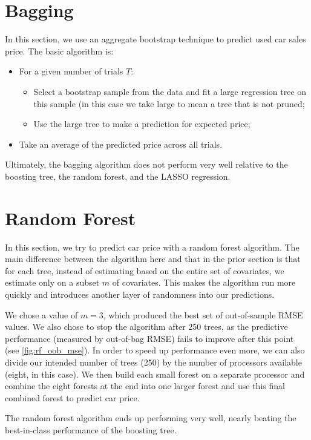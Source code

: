 \documentclass[11pt, fleqn]{article}
\begin{document}
\section{Bagging}

In this section, we use an aggregate bootstrap technique to predict used car sales price. The basic algorithm is:
\begin{itemize}
\item For a given number of trials $T$:
\begin{itemize}
\item Select a bootstrap sample from the data and fit a large regression tree on this sample (in this case we take large to mean a tree that is not pruned;
\item Use the large tree to make a prediction for expected price;
\end{itemize}
\item Take an average of the predicted price across all trials.
\end{itemize}

Ultimately, the bagging algorithm does not perform very well relative to the boosting tree, the random forest, and the LASSO regression. 

\section{Random Forest}

In this section, we try to predict car price with a random forest algorithm. The main difference between the algorithm here and that in the prior section is that for each tree, instead of estimating based on the entire set of covariates, we estimate only on a subset $m$ of covariates. This makes the algorithm run more quickly and introduces another layer of randomness into our predictions. 

We chose a value of $m=3$, which produced the best set of out-of-sample RMSE values. We also chose to stop the algorithm after 250 trees, as the predictive performance (measured by out-of-bag RMSE) fails to improve after this point (see \cref{fig:rf_oob_mse}). In order to speed up performance even more, we can also divide our intended number of trees (250) by the number of processors available (eight, in this case). We then build each small forest on a separate processor and combine the eight forests at the end into one larger forest and use this final combined forest to predict car price.

The random forest algorithm ends up performing very well, nearly beating the best-in-class performance of the boosting tree.
\end{document}
